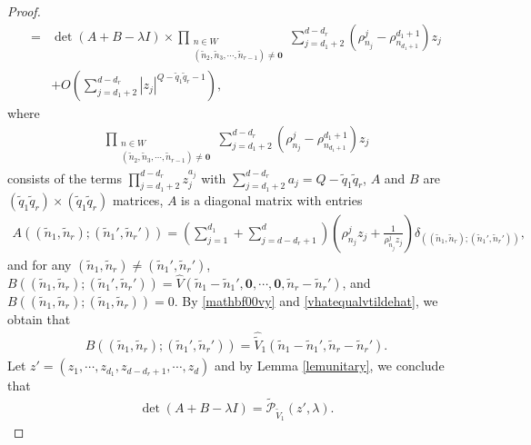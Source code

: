 \documentclass[12pt,letterpaper]{amsart}
\newcommand{\abs}[1]{\left\lvert #1 \right\rvert}
\begin{document}
\begin{proof}
\begin{align}
=&\det(A+B-\lambda I)\times\prod_{\substack{n\in W\\(\tilde{n}_2,\tilde{n}_3,\cdots,\tilde{n}_{r-1})\neq \mathbf{0}}}\sum_{j={d_1+2}}^{d-d_r}\left(\rho^j_{n_j}-\rho^{d_1+1}_{n_{d_1+1}}\right)z_j\nonumber\\
&+O\left(\sum_{j=d_1+2}^{d-d_r}\abs{z_j}^{Q-\tilde{q}_1\tilde{q}_r-1}\right),\nonumber
\end{align}
where
\begin{align}
\prod_{\substack{n\in W\\(\tilde{n}_2,\tilde{n}_3,\cdots,\tilde{n}_{r-1})\neq \mathbf{0}}}\sum_{j={d_1+2}}^{d-d_r}\left(\rho^j_{n_j}-\rho^{d_1+1}_{n_{d_1+1}}\right)z_j\nonumber
\end{align}
consists of the terms $\prod_{j=d_1+2}^{d-d_r}z_j^{a_j}$ with $\sum_{j=d_1+2}^{d-d_r}a_j=Q-\tilde{q}_1\tilde{q}_r$,
 $A$ and $B$ are $(\tilde{q}_1\tilde{q}_r)\times (\tilde{q}_1\tilde{q}_r)$ matrices, $A$ is a diagonal matrix with entries
\begin{align}
A((\tilde{n}_1,\tilde{n}_r);(\tilde{n}_1',\tilde{n}_r'))=\left(\sum_{j=1}^{d_1}+\sum_{j=d-d_r+1}^{d}\right)\left(\rho^j_{n_j}z_j+\frac{1}{\rho^j_{n_j}z_j}\right)\delta_{((\tilde{n}_1,\tilde{n}_r);(\tilde{n}_1',\tilde{n}_r'))},\nonumber
\end{align}
and for any $(\tilde{n}_1,\tilde{n}_r)\neq (\tilde{n}_1',\tilde{n}_r')$,  $B((\tilde{n}_1,\tilde{n}_r);(\tilde{n}_1',\tilde{n}_r'))=\hat{V}(\tilde{n}_1-\tilde{n}_1',\mathbf{0},\cdots,\mathbf{0},\tilde{n}_r-\tilde{n}_r')$, and $B((\tilde{n}_1,\tilde{n}_r);(\tilde{n}_1,\tilde{n}_r))=0$.
By \eqref{mathbf00vy} and \eqref{vhatequalvtildehat}, we obtain that
\begin{align}
B((\tilde{n}_1,\tilde{n}_r);(\tilde{n}_1',\tilde{n}_r'))=\hat{\tilde{V}}_1(\tilde{n}_1-\tilde{n}_1',\tilde{n}_r-\tilde{n}_r').\nonumber
\end{align}
Let $z'=(z_1,\cdots,z_{d_1},z_{d-d_r+1},\cdots,z_d)$ and by Lemma \ref{lemunitary}, we conclude  that
\begin{align}
\det(A+B-\lambda I)=\tilde{\mathcal{P}}_{\tilde{V}_1}(z',\lambda).\label{detabpv1}
\end{align}


\end{proof}
\end{document}
